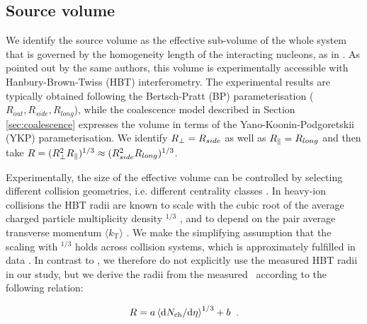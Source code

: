 \subsection{Source volume}
\label{SecSourceVolume}
We identify the source volume as the effective sub-volume of the whole system that is governed by the homogeneity length of the interacting nucleons, as in \cite{Scheibl:1998tk}. 
As pointed out by the same authors, this volume is experimentally accessible with Hanbury-Brown-Twiss (HBT) interferometry. 
The experimental results are typically obtained following the Bertsch-Pratt (BP) parameterisation ($R_{out}, R_{side}, R_{long}$), while the coalescence model described in Section \ref{sec:coalescence} expresses the volume in terms of the Yano-Koonin-Podgoretskii (YKP) parameterisation. %
We identify $R_{\perp} = R_{side}$ as well as $R_{\|} = R_{long}$ and then take $R = (R_{\perp}^{2}R_{\|})^{1/3} \approx (R_{side}^{2}R_{long})^{1/3}$.

Experimentally, the size of the effective volume can be controlled by selecting different collision geometries, i.e. different centrality classes \cite{Abelev:2013qoq}. In heavy-ion collisions the HBT radii are known to scale with the cubic root of the average charged particle multiplicity density \avdNdeta$^{1/3}$ \cite{Adam:2015vna}, and to depend on the pair average transverse momentum $\langle k_{\mathrm{T}}\rangle$ \cite{Aamodt:2011mr}. We make the simplifying assumption that the scaling with \avdNdeta$^{1/3}$ holds across collision systems, which is approximately fulfilled in data \cite{Adam:2015pya}. In contrast to \cite{Blum:2017qnn}, we therefore do not explicitly use the measured HBT radii in our study, but we derive the radii from the measured \avdNdeta~according to the following relation:

\begin{equation}
R = a \left<\mathrm{d}N_\mathrm{ch}/\mathrm{d}\eta\right>^{1/3} + b \;\;.
\label{eq:radiusParameterisation}
\end{equation}

